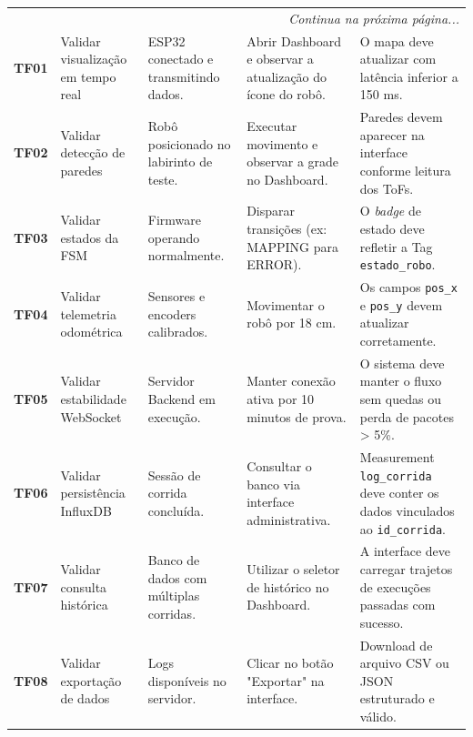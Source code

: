 \begin{apendicesenv}
\begin{longtable}{|p{}|p{}|p{}|p{}|p{}|}
    \hline \multicolumn{5}{r}{\textit{Continua na próxima página...}} \\
    \endfoot
    
    \hline
    \endlastfoot
    
    \textbf{TF01} & Validar visualização em tempo real & ESP32 conectado e transmitindo dados. & Abrir Dashboard e observar a atualização do ícone do robô. & O mapa deve atualizar com latência inferior a 150 ms. \\ \hline
    
    \textbf{TF02} & Validar detecção de paredes & Robô posicionado no labirinto de teste. & Executar movimento e observar a grade no Dashboard. & Paredes devem aparecer na interface conforme leitura dos ToFs. \\ \hline
    
    \textbf{TF03} & Validar estados da FSM & Firmware operando normalmente. & Disparar transições (ex: MAPPING para ERROR). & O \textit{badge} de estado deve refletir a Tag \texttt{estado\_robo}. \\ \hline
    
    \textbf{TF04} & Validar telemetria odométrica & Sensores e encoders calibrados. & Movimentar o robô por 18 cm. & Os campos \texttt{pos\_x} e \texttt{pos\_y} devem atualizar corretamente. \\ \hline
    
    \textbf{TF05} & Validar estabilidade WebSocket & Servidor Backend em execução. & Manter conexão ativa por 10 minutos de prova. & O sistema deve manter o fluxo sem quedas ou perda de pacotes > 5\%. \\ \hline
    
    \textbf{TF06} & Validar persistência InfluxDB & Sessão de corrida concluída. & Consultar o banco via interface administrativa. & Measurement \texttt{log\_corrida} deve conter os dados vinculados ao \texttt{id\_corrida}. \\ \hline
    
    \textbf{TF07} & Validar consulta histórica & Banco de dados com múltiplas corridas. & Utilizar o seletor de histórico no Dashboard. & A interface deve carregar trajetos de execuções passadas com sucesso. \\ \hline
    
    \textbf{TF08} & Validar exportação de dados & Logs disponíveis no servidor. & Clicar no botão "Exportar" na interface. & Download de arquivo CSV ou JSON estruturado e válido. \\ \hline
    

\end{longtable}
\end{apendicesenv}
